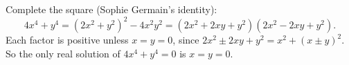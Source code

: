 Complete the square (Sophie Germain's identity):
\[
4x^4+y^4=(2x^2+y^2)^2-4x^2y^2=\boxed{(2x^2+2xy+y^2)(2x^2-2xy+y^2)}.
\]
Each factor is positive unless $x=y=0$, since $2x^2\pm2xy+y^2=x^2+(x\pm y)^2$. So the only real solution of $4x^4+y^4=0$ is $x=y=0$.
